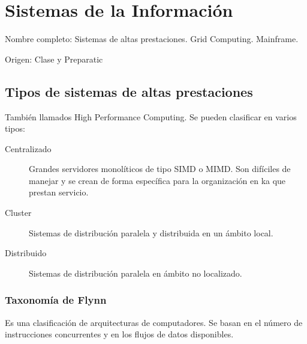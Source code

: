 \setcounter{section}{51}
\section{Sistemas de la Información}

Nombre completo: Sistemas de altas prestaciones. Grid Computing. Mainframe.

Origen: Clase y Preparatic

\localtableofcontents

\subsection{Tipos de sistemas de altas prestaciones}

También llamados High Performance Computing. Se pueden clasificar en varios tipos:
\begin{description}
    \item[Centralizado] Grandes servidores monolíticos de tipo SIMD o MIMD. Son difíciles de manejar y se crean de forma específica para la organización en ka que prestan servicio.
    \item[Cluster] Sistemas de distribución paralela y distribuida en un ámbito local.
    \item[Distribuido] Sistemas de distribución paralela en ámbito no localizado.
\end{description}

\subsubsection{Taxonomía de Flynn}
Es una clasificación de arquitecturas de computadores. Se basan en el número de instrucciones concurrentes y en los flujos de datos disponibles. 

